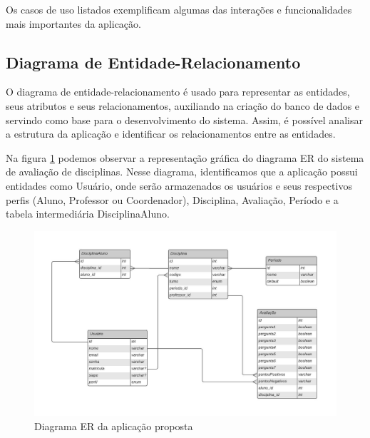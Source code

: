 Os casos de uso listados exemplificam algumas das interações e funcionalidades mais importantes da aplicação.

\subsection{Diagrama de Entidade-Relacionamento}

O diagrama de entidade-relacionamento é usado para representar as entidades, seus atributos e seus relacionamentos, auxiliando na criação do banco de dados e servindo como base para o desenvolvimento do sistema. Assim, é possível analisar a estrutura da aplicação e identificar os relacionamentos entre as entidades.

Na figura \ref{fig:fig_diagrama_er} podemos observar a representação gráfica do diagrama ER do sistema de avaliação de disciplinas. Nesse diagrama, identificamos que a aplicação possui entidades como Usuário, onde serão armazenados os usuários e seus respectivos perfis (Aluno, Professor ou Coordenador), Disciplina, Avaliação, Período e a tabela intermediária DisciplinaAluno. 

\begin{figure}[h]
  \centering
  \includegraphics[width=1\textwidth]{imagens/diagrama-er-sad.jpeg}
  \caption{Diagrama ER da aplicação proposta}
  \label{fig:fig_diagrama_er}
\end{figure}

%
%
%



%

